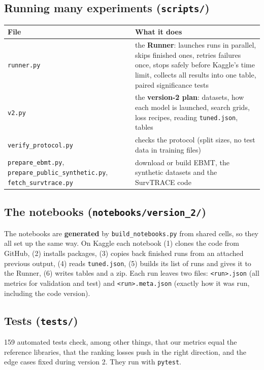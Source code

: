 \documentclass[11pt]{article}
\begin{document}
\subsection{Running many experiments (\texttt{scripts/})}
\begin{table}[H]
\centering
\small
\begin{tabularx}{\textwidth}{lY}
\toprule
File & What it does \\
\midrule
\texttt{runner.py} & the \textbf{Runner}: launches runs in parallel, skips finished ones, retries
  failures once, stops safely before Kaggle's time limit, collects all results into one table,
  paired significance tests \\
\texttt{v2.py} & the \textbf{version-2 plan}: datasets, how each model is launched, search grids, loss
  recipes, reading \texttt{tuned.json}, tables \\
\texttt{verify\_protocol.py} & checks the protocol (split sizes, no test data in training files) \\
\texttt{prepare\_ebmt.py}, \texttt{prepare\_public\_synthetic.py}, \texttt{fetch\_survtrace.py} &
  download or build EBMT, the synthetic datasets and the SurvTRACE code \\
\bottomrule
\end{tabularx}
\end{table}

\subsection{The notebooks (\texttt{notebooks/version\_2/})}
The notebooks are \textbf{generated} by \texttt{build\_notebooks.py} from shared cells, so they all set
up the same way. On Kaggle each notebook (1) clones the code from GitHub, (2) installs packages,
(3) copies back finished runs from an attached previous output, (4) reads \texttt{tuned.json},
(5) builds its list of runs and gives it to the Runner, (6) writes tables and a zip. Each run leaves
two files: \texttt{<run>.json} (all metrics for validation and test) and \texttt{<run>.meta.json}
(exactly how it was run, including the code version).

\subsection{Tests (\texttt{tests/})}
159 automated tests check, among other things, that our metrics equal the reference libraries, that
the ranking losses push in the right direction, and the edge cases fixed during version 2. They run
with \texttt{pytest}.
\end{document}
